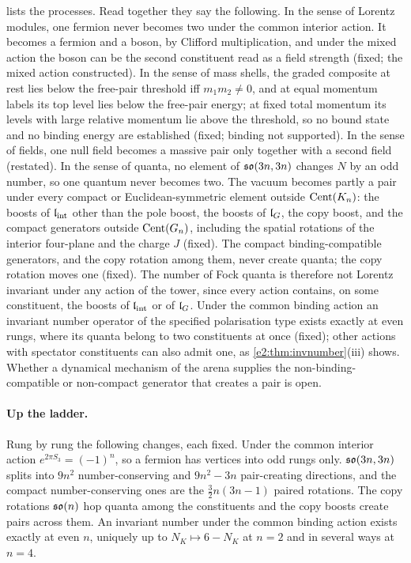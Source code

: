  lists the processes. Read together they say the following.
In the sense of Lorentz modules, one fermion never becomes two under the common interior action. It becomes a fermion and a boson, by Clifford
multiplication, and under the mixed action the boson can be the second constituent read as a field strength (fixed; the mixed action
constructed). In the sense of mass shells, the graded composite at rest lies below the free-pair threshold iff $m_1m_2\neq0$, and at equal
momentum labels its top level lies below the free-pair energy; at fixed total momentum its levels with large relative momentum lie above
the threshold, so no bound state and no binding energy are established (fixed; binding not supported). In the
sense of fields, one null field becomes a massive pair only together with a second field (restated). In the sense of quanta, no element of
$\mathfrak{so}(3n,3n)$ changes $N$ by an odd number, so one quantum never becomes two. The vacuum becomes partly a pair under every compact or
Euclidean-symmetric element outside $\operatorname{Cent}(K_n)$: the boosts of $\mathfrak l_{\rm int}$ other than the pole boost, the boosts of $\mathfrak l_G$, the copy boost, and the
compact generators outside $\operatorname{Cent}(G_n)$, including the spatial rotations of the interior four-plane and the charge $J$ (fixed). The compact binding-compatible generators, and the copy rotation among them, never create quanta; the copy rotation
moves one (fixed). The number of Fock quanta is therefore not Lorentz invariant under any action of the tower, since every action
contains, on some constituent, the boosts of $\mathfrak l_{\rm int}$ or of $\mathfrak l_G$. Under the common binding action an invariant number operator of the
specified polarisation type exists exactly at even rungs, where its quanta belong to two constituents at once (fixed); other actions with
spectator constituents can also admit one, as \cref{e2:thm:invnumber}(iii) shows. Whether a
dynamical mechanism of the arena supplies the non-binding-compatible or non-compact generator that creates a pair is open.

\paragraph{Up the ladder.} Rung by rung the following changes, each fixed. Under the common interior action $e^{2\pi S_3}=(-1)^n$, so a fermion
has vertices into odd rungs only. $\mathfrak{so}(3n,3n)$ splits into $9n^2$ number-conserving and $9n^2-3n$ pair-creating directions, and the compact
number-conserving ones are the $\tfrac32n(3n-1)$ paired rotations. The copy rotations $\mathfrak{so}(n)$ hop quanta among the constituents and the copy
boosts create pairs across them. An invariant number under the common binding action exists exactly at even $n$, uniquely up to
$N_K\mapsto6-N_K$ at $n=2$ and in several ways at $n=4$.

